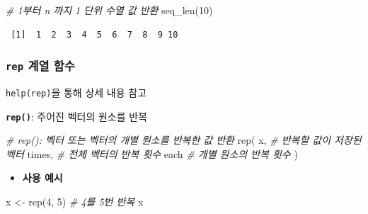 \documentclass[
  11pt,
]{krantz}
\makeatletter
\newenvironment{Shaded}{\begin{snugshade}}{\end{snugshade}}
\newcommand{\CommentTok}[1]{\textcolor[rgb]{0.37,0.37,0.37}{\textit{#1}}}
\newcommand{\DecValTok}[1]{\textcolor[rgb]{0.06,0.06,0.06}{#1}}
\newcommand{\FunctionTok}[1]{\textcolor[rgb]{0,0,0}{#1}}
\newcommand{\NormalTok}[1]{#1}
\newcommand{\OtherTok}[1]{\textcolor[rgb]{0.37,0.37,0.37}{#1}}
\providecommand{\tightlist}{%
  \setlength{\itemsep}{0pt}\setlength{\parskip}{0pt}}
\newenvironment{kframe}{%
\medskip{}
\setlength{\fboxsep}{.8em}
 \def\at@end@of@kframe{}%
 \ifinner\ifhmode%
  \def\at@end@of@kframe{\end{minipage}}%
  \begin{minipage}{\columnwidth}%
 \fi\fi%
 \def\FrameCommand##1{\hskip\@totalleftmargin \hskip-\fboxsep
 \colorbox{shadecolor}{##1}\hskip-\fboxsep
     \hskip-\linewidth \hskip-\@totalleftmargin \hskip\columnwidth}%
 \MakeFramed {\advance\hsize-\width
   \@totalleftmargin\z@ \linewidth\hsize
   \@setminipage}}%
 {\par\unskip\endMakeFramed%
 \at@end@of@kframe}
\renewenvironment{quote}{\begin{kframe}}{\end{kframe}}
\makeatother
\begin{document}
\footnotesize

\begin{Shaded}
\begin{Highlighting}[]
\CommentTok{\# 1부터 n 까지 1 단위 수열 값 반환}
\FunctionTok{seq\_len}\NormalTok{(}\DecValTok{10}\NormalTok{)}
\end{Highlighting}
\end{Shaded}

\begin{verbatim}
 [1]  1  2  3  4  5  6  7  8  9 10
\end{verbatim}

\normalsize

\hypertarget{fun-rep}{%
\subsubsection*{\texorpdfstring{\textbf{\texttt{rep}} 계열 함수}{rep 계열 함수}}\label{fun-rep}}


\begin{quote}
\texttt{help(rep)}을 통해 상세 내용 참고
\end{quote}

\textbf{\texttt{rep()}}: 주어진 벡터의 원소를 반복

\footnotesize

\begin{Shaded}
\begin{Highlighting}[]
\CommentTok{\# rep(): 벡터 또는 벡터의 개별 원소를 반복한 값 반환}
\FunctionTok{rep}\NormalTok{(}
\NormalTok{  x, }\CommentTok{\# 반복할 값이 저장된 벡터}
\NormalTok{  times, }\CommentTok{\# 전체 벡터의 반복 횟수}
\NormalTok{  each }\CommentTok{\# 개별 원소의 반복 횟수}
\NormalTok{)}
\end{Highlighting}
\end{Shaded}

\normalsize

\begin{itemize}
\tightlist
\item
  \textbf{사용 예시}
\end{itemize}

\footnotesize

\begin{Shaded}
\begin{Highlighting}[]
\NormalTok{x }\OtherTok{\textless{}{-}} \FunctionTok{rep}\NormalTok{(}\DecValTok{4}\NormalTok{, }\DecValTok{5}\NormalTok{) }\CommentTok{\# 4를 5번 반복}
\NormalTok{x}
\end{Highlighting}
\end{Shaded}
\end{document}
